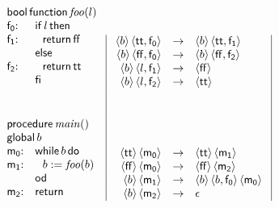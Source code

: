 \begin{figure}
\[
\begin{array}{ll}
\multicolumn{2}{l}
{{\sf bool}\,{\sf function}\,{\it foo}(l)}\\
{\sf f_0}{:} & {\sf if}\,l\,{\sf then}\\
{\sf f_1}{:} & ~~ {\sf return}\,{\sf ff}\\
       & {\sf else}\\
{\sf f_2}{:} & ~~ {\sf return}\,{\sf tt}\\
       & {\sf fi}\\[15pt]
\\
\multicolumn{2}{l}
{{\sf procedure}\,{\it main}()}\\
\multicolumn{2}{l}
{{\sf global}\,b}\\
{\sf m_0}{:} & {\sf while}\,b\,{\sf do}\\
{\sf m_1}{:} & ~~ b := {\it foo}(b)\\
       & {\sf od}\\
{\sf m_2}{:} & {\sf return}\\[15pt]
\\
\end{array}
~
\begin{array}{|rcl|}
~ \langle b \rangle\,\langle {\sf tt}, {\sf f_0} \rangle 
  & \rightarrow & \langle b \rangle\,\langle {\sf tt}, {\sf f_1} \rangle\\
\langle b \rangle\,\langle {\sf ff}, {\sf f_0} \rangle
  & \rightarrow & \langle b \rangle\,\langle {\sf ff},{\sf f_2} \rangle\\
\langle b \rangle\,\langle l, {\sf f_1} \rangle 
  & \rightarrow & \langle {\sf ff} \rangle\\
\langle b \rangle\,\langle l, {\sf f_2} \rangle 
  & \rightarrow & \langle {\sf tt} \rangle\\
  & & \\[15pt]
  & & \\
  & & \\
\langle {\sf tt} \rangle\,\langle {\sf m_0} \rangle
  & \rightarrow & \langle {\sf tt} \rangle\, \langle {\sf m_1} \rangle\\
\langle {\sf ff} \rangle\,\langle {\sf m_0} \rangle
  & \rightarrow & \langle {\sf ff} \rangle\,\langle {\sf m_2} \rangle\\
\langle b \rangle\,\langle {\sf m_1} \rangle
  & \rightarrow & \langle b \rangle\,\langle b, {\sf f_0} \rangle\,
\langle{\sf m_0}\rangle  ~\\
\langle b \rangle\,\langle {\sf m_2} \rangle
  & \rightarrow & \epsilon\\

\end{array}\]
\end{figure}
